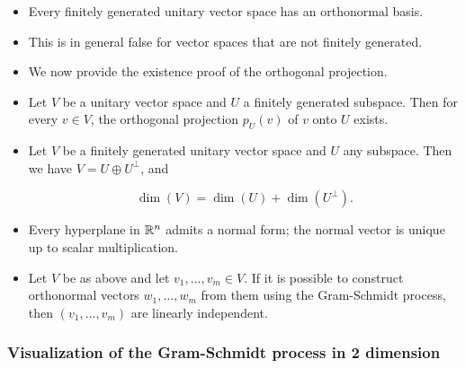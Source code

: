 \begin{itemize}

    \item Every finitely generated unitary vector space has an orthonormal basis.
    
    \item This is in general false for vector spaces that are not finitely generated.
    
    \item We now provide the existence proof of the orthogonal projection.
    
    \item Let \( V \) be a unitary vector space and \( U \) a finitely generated subspace. 
          Then for every \( v \in V \), the orthogonal projection \( p_U(v) \) of \( v \) onto \( U \) 
          exists.

    \item Let \( V \) be a finitely generated unitary vector space and \( U \) any subspace. Then we have \( V = U \oplus U^\perp \), and
      
          \[
                \dim(V) = \dim(U) + \dim(U^\perp).
          \]
    
    \item Every hyperplane in \( \mathbb{R}^n \) admits a normal form; the normal vector is 
          unique up to scalar multiplication.
    
    \item Let \( V \) be as above and let \( v_1, \ldots, v_m \in V \). If it is possible to 
          construct orthonormal vectors \( w_1, \ldots, w_m \) from them using the Gram-Schmidt process, 
          then \( (v_1, \ldots, v_m) \) are linearly independent.

\end{itemize}


\subsubsection{Visualization of the Gram-Schmidt process in 2 dimension}

\begin{center}
\end{center}

